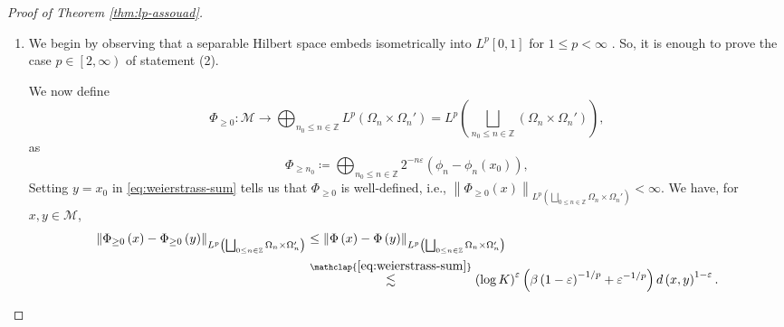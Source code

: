 \documentclass[11pt,reqno]{amsart}
\newcommand{\1}{\mathbf 1}
\begin{document}
\begin{proof}[Proof of Theorem \ref{thm:lp-assouad}]
\begin{enumerate}
All in all, we have for $x,y\in \mathcal{M}$ distinct,
\begin{align*}
\frac{\beta}{\left(1-\varepsilon\right)^{1/p}} \left(\log K\right)^{\varepsilon}K^{-64\beta/p}&\lesssim\frac{\left\|\Phi\left(x\right)-\Phi\left(y\right)\right\|_{L^p\left(\bigsqcup_{n\in \mathbb{Z}}\Omega_n\times \Omega_n'\right)}}{d\left(x,y\right)^{1-\varepsilon}}\\
&\lesssim  \left(\log K\right)^{\varepsilon} \left(\frac{\beta}{\left(1-\varepsilon\right)^{1/p}}+\frac{1}{\varepsilon^{1/p}}\right),
\end{align*}
and the $\left(1-\varepsilon\right)$-bi-H\"older distortion of the map $\Phi$ is
\[
\frac{\frac{\beta}{\left(1-\varepsilon\right)^{1/p}}+\frac{1}{\varepsilon^{1/p}}}{\frac{\beta}{\left(1-\varepsilon\right)^{1/p}} }K^{64\beta/p}\asymp \left(1+\beta^{-1}\frac{\left(1-\varepsilon\right)^{1/p}}{\varepsilon^{1/p}}\right)K^{64\beta/p}.
\]
With the choice of $\beta=\min\left\{\frac{p}{64\log K},\frac{1}{64}\right\}$, we have
\[
\left(1+\beta^{-1}\frac{\left(1-\varepsilon\right)^{1/p}}{\varepsilon^{1/p}}\right)K^{64\beta/p}\asymp 1+\frac{\left(1-\varepsilon\right)^{1/p}}{\varepsilon^{1/p}}\max\left\{\frac{\log K}{p},1\right\}.
\]
This gives statement (1).

\item
We begin by observing that a separable Hilbert space embeds isometrically into $L^p[0,1]$ for $1\le p<\infty$ \cite[Proposition 6.4.13]{albiac2006topics}.
So, it is enough to prove the case $p\in \left[2,\infty\right)$ of statement (2).


We now define 
\[
\Phi_{\ge 0}:\mathcal{M}\to \bigoplus_{n_0\le n\in \mathbb{Z}} L^p\left(\Omega_n\times \Omega_n'\right)=L^p\left(\bigsqcup_{n_0\le n\in \mathbb{Z}}(\Omega_n\times \Omega_n')\right),
\]
as
\[
\Phi_{\ge n_0}\coloneqq\bigoplus_{n_0\le n\in \mathbb{Z}}2^{-n\varepsilon}\left(\phi_n-\phi_n\left(x_0\right)\right),
\]
Setting $y=x_0$ in \eqref{eq:weierstrass-sum} tells us that $\Phi_{\ge 0}$ is well-defined, i.e., $\left\|\Phi_{\ge 0}\left(x\right)\right\|_{L^p\left(\bigsqcup_{0\le n\in \mathbb{Z}}\Omega_n\times \Omega_n'\right)}<\infty$. We have, for $x,y\in \mathcal{M}$,
\begin{align*}
\left\|\Phi_{\ge 0}\left(x\right)-\Phi_{\ge 0}\left(y\right)\right\|_{L^p\left(\bigsqcup_{0\le n\in \mathbb{Z}}\Omega_n\times \Omega_n'\right)}&\le \left\|\Phi\left(x\right)-\Phi\left(y\right)\right\|_{L^p\left(\bigsqcup_{0\le n\in \mathbb{Z}}\Omega_n\times \Omega_n'\right)}\\
&\stackrel{\mathclap{\eqref{eq:weierstrass-sum}}}{\lesssim}  \left(\log K\right)^{\varepsilon} \left(\beta\left(1-\varepsilon\right)^{-1/p}+\varepsilon^{-1/p}\right) d\left(x,y\right)^{1-\varepsilon}.
\end{align*}


\end{enumerate}
\end{proof}
\end{document}
